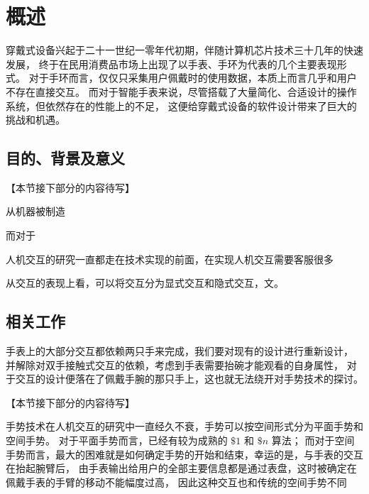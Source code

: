 \chapter{概述}

穿戴式设备兴起于二十一世纪一零年代初期，伴随计算机芯片技术三十几年的快速发展，
终于在民用消费品市场上出现了以手表、手环为代表的几个主要表现形式。
对于手环而言，仅仅只采集用户佩戴时的使用数据，本质上而言几乎和用户不存在直接交互。
而对于智能手表来说，尽管搭载了大量简化、合适设计的操作系统，但依然存在的性能上的不足，
这便给穿戴式设备的软件设计带来了巨大的挑战和机遇\cite{DBLP:journals/corr/JiangCZZKZ15}。

\section{目的、背景及意义}

【本节接下部分的内容待写】

从机器被制造\cite{dongshihai2004}

而对于

人机交互的研究一直都走在技术实现的前面，在实现人机交互\cite{hudson2014concepts}需要客服很多

从交互的表现上看，可以将交互分为显式交互和隐式交互，文\cite{yuweining2004}。

\section{相关工作}

手表上的大部分交互都依赖两只手来完成，我们要对现有的设计进行重新设计，
并解除对双手接触式交互的依赖，考虑到手表需要抬碗才能观看的自身属性，
对于交互的设计便落在了佩戴手腕的那只手上，这也就无法绕开对手势技术的探讨。

【本节接下部分的内容待写】

手势技术在人机交互的研究中一直经久不衰，手势可以按空间形式分为平面手势和空间手势。
对于平面手势而言，已经有较为成熟的 $\$1$ \cite{wobbrock2007gestures}
和 $\$n$ \cite{anthony2010lightweight}算法；
而对于空间手势而言，最大的困难就是如何确定手势的开始和结束，幸运的是，与手表的交互在抬起腕臂后，
由手表输出给用户的全部主要信息都是通过表盘，这时被确定在佩戴手表的手臂的移动不能幅度过高，
因此这种交互也和传统的空间手势不同
